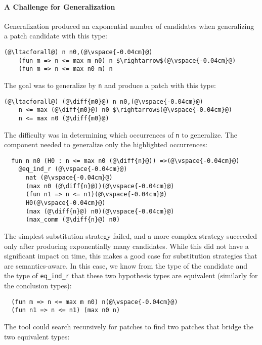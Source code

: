 \paragraph{A Challenge for Generalization} Generalization produced an exponential number of candidates when generalizing a patch candidate with this type:

\begin{lstlisting}[language=coq]
  (@\ltacforall@) n n0,(@\vspace{-0.04cm}@)
    (fun m => n <= max m n0) n $\rightarrow$(@\vspace{-0.04cm}@)
    (fun m => n <= max n0 m) n
\end{lstlisting}
The goal was to generalize by \lstinline{n} and produce a patch with this type:

\begin{lstlisting}[language=coq]
  (@\ltacforall@) (@\diff{m0}@) n n0,(@\vspace{-0.04cm}@)
    n <= max (@\diff{m0}@) n0 $\rightarrow$(@\vspace{-0.04cm}@)
    n <= max n0 (@\diff{m0}@)
\end{lstlisting}
The difficulty was in determining which occurrences of \lstinline{n} to generalize.
The component needed to generalize only the highlighted occurrences:

\begin{lstlisting}
  fun n n0 (H0 : n <= max n0 (@\diff{n}@)) =>(@\vspace{-0.04cm}@)
    @eq_ind_r (@\vspace{-0.04cm}@)
      nat (@\vspace{-0.04cm}@)
      (max n0 (@\diff{n}@))(@\vspace{-0.04cm}@)
      (fun n1 => n <= n1)(@\vspace{-0.04cm}@)
      H0(@\vspace{-0.04cm}@)
      (max (@\diff{n}@) n0)(@\vspace{-0.04cm}@)
      (max_comm (@\diff{n}@) n0)
\end{lstlisting}
The simplest substitution strategy failed, and a more
complex strategy
succeeded only after producing exponentially many candidates.
While this did not have a significant impact on time,
this makes a good case for substitution strategies that are semantics-aware.
In this case, we know from the type of the candidate
and the type of \lstinline{eq_ind_r} that these two hypothesis types 
are equivalent (similarly for the conclusion types):

\begin{lstlisting}
  (fun m => n <= max m n0) n(@\vspace{-0.04cm}@)
  (fun n1 => n <= n1) (max n0 n)
\end{lstlisting}
The tool could search recursively for patches to find two patches that bridge the two equivalent
types:

